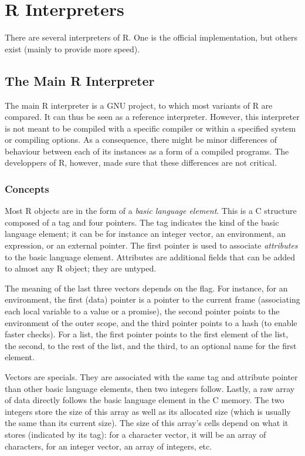 \documentclass{article}
\newcommand\R{R}
\newcommand\Cn{C}
\begin{document}
\section{\R{} Interpreters}
\label{sec:interpreters}

There are several interpreters of \R{}.
One is the official implementation,
but others exist (mainly to provide more speed).

\subsection{The Main \R{} Interpreter}
\label{sec:main:interpreter}

The main \R{} interpreter is a GNU project,
to which most variants of \R{} are compared.
It can thus be seen as a reference interpreter.
However, this interpreter is not meant to be compiled
with a specific compiler or within a specified system
or compiling options.
As a consequence, there might be minor differences
of behaviour between each of its instances as a form
of a compiled programs.
The developpers of \R{}, however, made sure that these
differences are not critical. %

\subsubsection{Concepts}
\label{sec:concepts}

Most \R{} objects are in the form of a \emph{basic language element}.
This is a \Cn{} structure composed of a tag and four pointers.
The tag indicates the kind of the basic language element;
it can be for instance an integer vector, an environment, an expression, or an external pointer.
The first pointer is used to associate \emph{attributes} to the basic language element.
Attributes are additional fields that can be added to almost any \R{} object;
they are untyped.

The meaning of the last three vectors depends on the flag.
%
For instance, for an environment, the first (data) pointer is a pointer
to the current frame (associating each local variable to a value or a promise),
the second pointer points to the environment of the outer scope,
and the third pointer points to a hash (to enable faster checks).
%
For a list, the first pointer points to the first element of the list,
the second, to the rest of the list,
and the third, to an optional name for the first element.

Vectors are specials.
They are associated with the same tag and attribute pointer
than other basic language elements,
then two integers follow.
Lastly, a raw array of data directly follows the basic language element in the \Cn{} memory.
The two integers store the size of this array as well as its allocated size
(which is usually the same than its current size).
The size of this array’s cells depend on what it stores
(indicated by its tag):
for a character vector, it will be an array of characters,
for an integer vector, an array of integers, etc.
\end{document}
